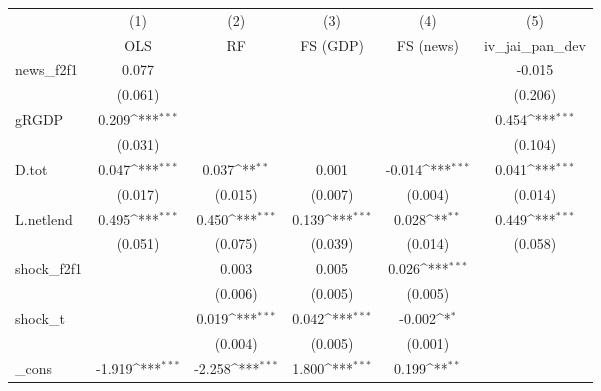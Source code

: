 {
\def\sym#1{\ifmmode^{#1}\else\(^{#1}\)\fi}
\begin{tabular}{l*{5}{c}}
\toprule
            &\multicolumn{1}{c}{(1)}&\multicolumn{1}{c}{(2)}&\multicolumn{1}{c}{(3)}&\multicolumn{1}{c}{(4)}&\multicolumn{1}{c}{(5)}\\
            &\multicolumn{1}{c}{OLS}&\multicolumn{1}{c}{RF}&\multicolumn{1}{c}{FS (GDP)}&\multicolumn{1}{c}{FS (news)}&\multicolumn{1}{c}{iv\_jai\_pan\_dev}\\
\midrule
news\_f2f1   &       0.077         &                     &                     &                     &      -0.015         \\
            &     (0.061)         &                     &                     &                     &     (0.206)         \\
\addlinespace
gRGDP       &       0.209\sym{***}&                     &                     &                     &       0.454\sym{***}\\
            &     (0.031)         &                     &                     &                     &     (0.104)         \\
\addlinespace
D.tot       &       0.047\sym{***}&       0.037\sym{**} &       0.001         &      -0.014\sym{***}&       0.041\sym{***}\\
            &     (0.017)         &     (0.015)         &     (0.007)         &     (0.004)         &     (0.014)         \\
\addlinespace
L.netlend   &       0.495\sym{***}&       0.450\sym{***}&       0.139\sym{***}&       0.028\sym{**} &       0.449\sym{***}\\
            &     (0.051)         &     (0.075)         &     (0.039)         &     (0.014)         &     (0.058)         \\
\addlinespace
shock\_f2f1  &                     &       0.003         &       0.005         &       0.026\sym{***}&                     \\
            &                     &     (0.006)         &     (0.005)         &     (0.005)         &                     \\
\addlinespace
shock\_t     &                     &       0.019\sym{***}&       0.042\sym{***}&      -0.002\sym{*}  &                     \\
            &                     &     (0.004)         &     (0.005)         &     (0.001)         &                     \\
\addlinespace
\_cons      &      -1.919\sym{***}&      -2.258\sym{***}&       1.800\sym{***}&       0.199\sym{**} &                     \\

\end{tabular}}
